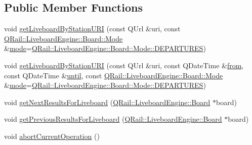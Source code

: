 \subsection*{Public Member Functions}
\begin{DoxyCompactItemize}
\item 
void \mbox{\hyperlink{classQRail_1_1LiveboardEngine_1_1Factory_adc3e3cb8c87171641f33f77367074a02}{get\+Liveboard\+By\+Station\+U\+RI}} (const Q\+Url \&uri, const \mbox{\hyperlink{classQRail_1_1LiveboardEngine_1_1Board_a0ab6d318f405895f62c6e98cb2d86c6e}{Q\+Rail\+::\+Liveboard\+Engine\+::\+Board\+::\+Mode}} \&\mbox{\hyperlink{classQRail_1_1LiveboardEngine_1_1Factory_a03deeb607999848d402a5a3af40967f4}{mode}}=\mbox{\hyperlink{classQRail_1_1LiveboardEngine_1_1Board_a0ab6d318f405895f62c6e98cb2d86c6ea560e6dfa758a32c703224545b841a386}{Q\+Rail\+::\+Liveboard\+Engine\+::\+Board\+::\+Mode\+::\+D\+E\+P\+A\+R\+T\+U\+R\+ES}})
\item 
void \mbox{\hyperlink{classQRail_1_1LiveboardEngine_1_1Factory_a3fc799d424334fe21be54a3cba0853be}{get\+Liveboard\+By\+Station\+U\+RI}} (const Q\+Url \&uri, const Q\+Date\+Time \&\mbox{\hyperlink{classQRail_1_1LiveboardEngine_1_1Factory_a883b4e0b9af113d312c6828b64d07258}{from}}, const Q\+Date\+Time \&\mbox{\hyperlink{classQRail_1_1LiveboardEngine_1_1Factory_a040529d305e2cc4d19b68f48817f7a90}{until}}, const \mbox{\hyperlink{classQRail_1_1LiveboardEngine_1_1Board_a0ab6d318f405895f62c6e98cb2d86c6e}{Q\+Rail\+::\+Liveboard\+Engine\+::\+Board\+::\+Mode}} \&\mbox{\hyperlink{classQRail_1_1LiveboardEngine_1_1Factory_a03deeb607999848d402a5a3af40967f4}{mode}}=\mbox{\hyperlink{classQRail_1_1LiveboardEngine_1_1Board_a0ab6d318f405895f62c6e98cb2d86c6ea560e6dfa758a32c703224545b841a386}{Q\+Rail\+::\+Liveboard\+Engine\+::\+Board\+::\+Mode\+::\+D\+E\+P\+A\+R\+T\+U\+R\+ES}})
\item 
void \mbox{\hyperlink{classQRail_1_1LiveboardEngine_1_1Factory_ad769a2f6bcfe1b411d83bd59bc4bc83b}{get\+Next\+Results\+For\+Liveboard}} (\mbox{\hyperlink{classQRail_1_1LiveboardEngine_1_1Board}{Q\+Rail\+::\+Liveboard\+Engine\+::\+Board}} $\ast$board)
\item 
void \mbox{\hyperlink{classQRail_1_1LiveboardEngine_1_1Factory_a01901090bd5f8be7d6f7c7f52ed88db0}{get\+Previous\+Results\+For\+Liveboard}} (\mbox{\hyperlink{classQRail_1_1LiveboardEngine_1_1Board}{Q\+Rail\+::\+Liveboard\+Engine\+::\+Board}} $\ast$board)
\item 
void \mbox{\hyperlink{classQRail_1_1LiveboardEngine_1_1Factory_a5a581cb60c12dea0af977ea08c64e0c8}{abort\+Current\+Operation}} ()

\end{DoxyCompactItemize}
